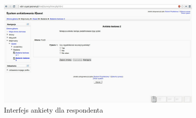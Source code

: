 \begin{figure}[H]
\centering\includegraphics[width=0.9\textwidth]{figures/kb/W2-odpowiadanienanakiete}
\caption{Interfejs ankiety dla respondenta}\label{rys:OdpowiadanieNaAnkiete}
\end{figure}